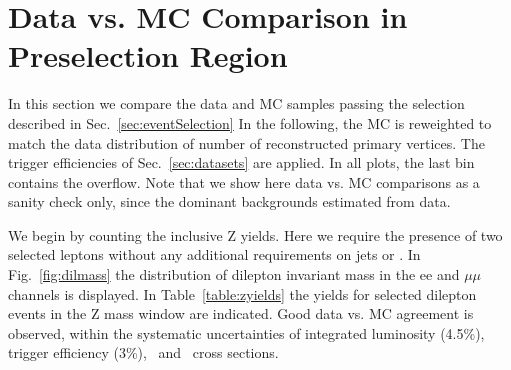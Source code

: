 \clearpage

\section{Data vs. MC Comparison in Preselection Region}
\label{sec:yields}

In this section we compare the data and MC samples passing the selection described in Sec.~\ref{sec:eventSelection}
In the following, the MC is reweighted to match the data distribution of number of reconstructed primary vertices.
The trigger efficiencies of Sec.~\ref{sec:datasets} are applied. In all plots, the last bin contains the overflow.
Note that we show here data vs. MC comparisons as a sanity check only, since the dominant backgrounds estimated from data.

We begin by counting the inclusive Z yields. Here we require the presence of two selected leptons without
any additional requirements on jets or \MET. In Fig.~\ref{fig:dilmass} the distribution of dilepton invariant
mass in the ee and $\mu\mu$ channels is displayed. In Table~\ref{table:zyields} the yields for selected dilepton
events in the Z mass window are indicated. Good data vs. MC agreement is observed, within the systematic uncertainties
of integrated luminosity (4.5\%), trigger efficiency (3\%), \zjets\ and \ttbar\ cross sections.


